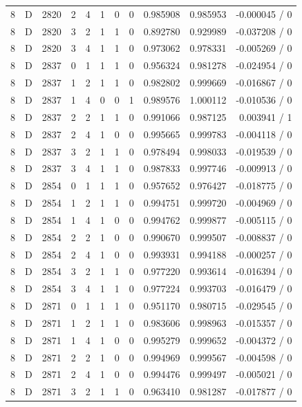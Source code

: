 \begin{longtable}{@{}rlrrlrrrrrr@{}}
8 & D & 2820 & 2 & 4 & 1 & 0 & 0 & 0.985908 & 0.985953 & -0.000045 / 0 \\
8 & D & 2820 & 3 & 2 & 1 & 1 & 0 & 0.892780 & 0.929989 & -0.037208 / 0 \\
8 & D & 2820 & 3 & 4 & 1 & 1 & 0 & 0.973062 & 0.978331 & -0.005269 / 0 \\
8 & D & 2837 & 0 & 1 & 1 & 1 & 0 & 0.956324 & 0.981278 & -0.024954 / 0 \\
8 & D & 2837 & 1 & 2 & 1 & 1 & 0 & 0.982802 & 0.999669 & -0.016867 / 0 \\
8 & D & 2837 & 1 & 4 & 0 & 0 & 1 & 0.989576 & 1.000112 & -0.010536 / 0 \\
8 & D & 2837 & 2 & 2 & 1 & 1 & 0 & 0.991066 & 0.987125 & 0.003941 / 1 \\
8 & D & 2837 & 2 & 4 & 1 & 0 & 0 & 0.995665 & 0.999783 & -0.004118 / 0 \\
8 & D & 2837 & 3 & 2 & 1 & 1 & 0 & 0.978494 & 0.998033 & -0.019539 / 0 \\
8 & D & 2837 & 3 & 4 & 1 & 1 & 0 & 0.987833 & 0.997746 & -0.009913 / 0 \\
8 & D & 2854 & 0 & 1 & 1 & 1 & 0 & 0.957652 & 0.976427 & -0.018775 / 0 \\
8 & D & 2854 & 1 & 2 & 1 & 1 & 0 & 0.994751 & 0.999720 & -0.004969 / 0 \\
8 & D & 2854 & 1 & 4 & 1 & 0 & 0 & 0.994762 & 0.999877 & -0.005115 / 0 \\
8 & D & 2854 & 2 & 2 & 1 & 0 & 0 & 0.990670 & 0.999507 & -0.008837 / 0 \\
8 & D & 2854 & 2 & 4 & 1 & 0 & 0 & 0.993931 & 0.994188 & -0.000257 / 0 \\
8 & D & 2854 & 3 & 2 & 1 & 1 & 0 & 0.977220 & 0.993614 & -0.016394 / 0 \\
8 & D & 2854 & 3 & 4 & 1 & 1 & 0 & 0.977224 & 0.993703 & -0.016479 / 0 \\
8 & D & 2871 & 0 & 1 & 1 & 1 & 0 & 0.951170 & 0.980715 & -0.029545 / 0 \\
8 & D & 2871 & 1 & 2 & 1 & 1 & 0 & 0.983606 & 0.998963 & -0.015357 / 0 \\
8 & D & 2871 & 1 & 4 & 1 & 0 & 0 & 0.995279 & 0.999652 & -0.004372 / 0 \\
8 & D & 2871 & 2 & 2 & 1 & 0 & 0 & 0.994969 & 0.999567 & -0.004598 / 0 \\
8 & D & 2871 & 2 & 4 & 1 & 0 & 0 & 0.994476 & 0.999497 & -0.005021 / 0 \\
8 & D & 2871 & 3 & 2 & 1 & 1 & 0 & 0.963410 & 0.981287 & -0.017877 / 0 \\

\end{longtable}
